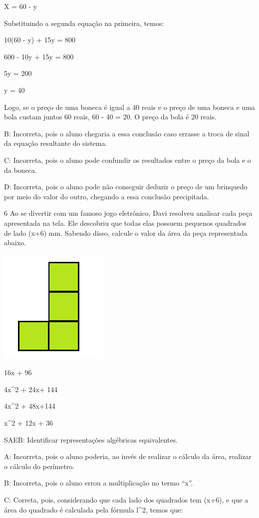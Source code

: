 {X = 60 - y

Substituindo a segunda equação na primeira, temos:

10(60 - y) + 15y = 800

600 - 10y + 15y = 800

5y = 200

y = 40

Logo, se o preço de uma boneca é igual a 40 reais e o preço de uma
boneca e uma bola custam juntos 60 reais, 60 - 40 = 20. O preço da bola
é 20 reais.

B: Incorreta, pois o aluno chegaria a essa conclusão caso errasse a
troca de sinal da equação resultante do sistema.

C: Incorreta, pois o aluno pode confundir os resultados entre o preço da
bola e o da boneca.

D: Incorreta, pois o aluno pode não conseguir deduzir o preço de um
brinquedo por meio do valor do outro, chegando a essa conclusão
precipitada.

\num{6} Ao se divertir com um famoso jogo eletrônico, Davi resolveu analisar
cada peça apresentada na tela. Ele descobriu que todas elas possuem
pequenos quadrados de lado (x+6) mm. Sabendo disso, calcule o valor da
área da peça representada abaixo.

\includegraphics[width=2.05833in,height=2.16573in]{./imgSAEB_8_MAT/media/image57.png}
\item 16x + 96
\item 4x^2 + 24x+ 144
\item 4x^2 + 48x+144
\item x^2 + 12x + 36

SAEB: Identificar representações algébricas equivalentes.

A: Incorreta, pois o aluno poderia, ao invés de realizar o cálculo da
área, realizar o cálculo do perímetro.

B: Incorreta, pois o aluno errou a multiplicação no termo ``x''.

C: Correta, pois, considerando que cada lado dos quadrados tem (x+6), e
que a área do quadrado é calculada pela fórmula l^2, temos que:

}
